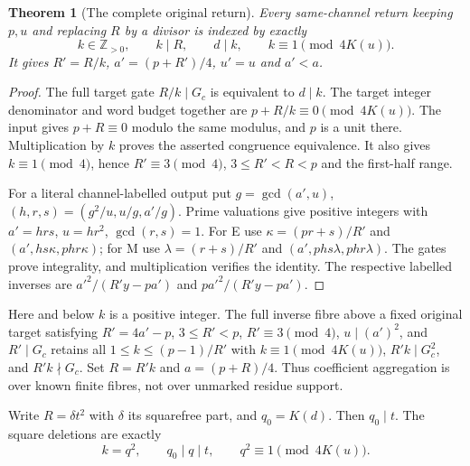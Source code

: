\documentclass[11pt]{article}
\newtheorem{theorem}{Theorem}
\begin{document}
\begin{theorem}[The complete original return]
Every same-channel return keeping $p,u$ and replacing $R$ by a divisor is
indexed by exactly
\[
 \boxed{k\in\mathbb Z_{>0},\qquad k\mid R,\qquad d\mid k,
 \qquad k\equiv1\pmod{4K(u)}.}
\]
It gives $R'=R/k$, $a'=(p+R')/4$, $u'=u$ and $a'<a$.
\end{theorem}
\begin{proof}
The full target gate $R/k\mid G_c$ is equivalent to $d\mid k$.
The target integer denominator and word budget together are
$p+R/k\equiv0\pmod{4K(u)}$. The input gives $p+R\equiv0$ modulo the same
modulus, and $p$ is a unit there. Multiplication by $k$ proves the asserted
congruence equivalence. It also gives $k\equiv1\pmod4$, hence
$R'\equiv3\pmod4$, $3\le R'<R<p$ and the first-half range.

For a literal channel-labelled output put $g=\gcd(a',u)$,
$(h,r,s)=(g^2/u,u/g,a'/g)$. Prime valuations give positive integers with
$a'=hrs$, $u=hr^2$, $\gcd(r,s)=1$. For E use
$\kappa=(pr+s)/R'$ and $(a',hs\kappa,phr\kappa)$; for M use
$\lambda=(r+s)/R'$ and $(a',phs\lambda,phr\lambda)$.
The gates prove integrality, and multiplication verifies the identity.
The respective labelled inverses are $a'^2/(R'y-pa')$ and
$pa'^2/(R'y-pa')$.
\end{proof}

Here and below $k$ is a positive integer.  The full inverse fibre above a fixed
original target satisfying $R'=4a'-p$, $3\le R'<p$, $R'\equiv3\pmod4$,
$u\mid(a')^2$, and $R'\mid G_c$ retains all
$1\le k\le(p-1)/R'$ with $k\equiv1\pmod{4K(u)}$,
$R'k\mid G_c^2$, and $R'k\nmid G_c$. Set $R=R'k$ and $a=(p+R)/4$.
Thus coefficient aggregation is over known finite fibres, not over unmarked
residue support.

Write $R=\delta t^2$ with $\delta$ its squarefree part, and $q_0=K(d)$.
Then $q_0\mid t$. The square deletions are exactly
\[
 k=q^2,\qquad q_0\mid q\mid t,\qquad q^2\equiv1\pmod{4K(u)}.
\]
\end{document}
